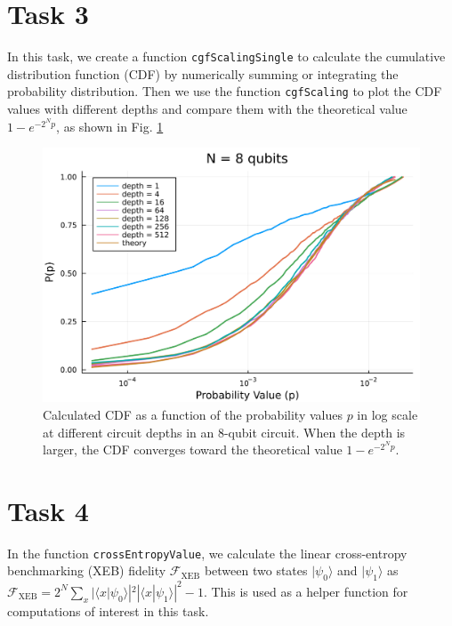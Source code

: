 \documentclass[12pt]{article}
\begin{document}
\section*{Task 3}

In this task, we create a function \texttt{cgfScalingSingle} to calculate the cumulative distribution function (CDF) by numerically summing or integrating the probability distribution. Then we use the function \texttt{cgfScaling} to plot the CDF values with different depths and compare them with the theoretical value $1-e^{-2^Np}$, as shown in Fig. \ref{fig:cdf}

\begin{figure}
	\centering
	\includegraphics [width=0.8\linewidth] {figures/Task3}
	\caption{
		Calculated CDF as a function of the probability values $p$ in log scale at different circuit depths in an 8-qubit circuit. When the depth is larger, the CDF converges toward the theoretical value $1- e^{-2^Np}$.
	}
	\label{fig:cdf}
\end{figure}

\section*{Task 4}

In the function \texttt{crossEntropyValue}, we calculate the linear cross-entropy benchmarking (XEB) fidelity $\mathcal{F}_\mathrm{XEB}$ between two states $|\psi_0\rangle$ and $|\psi_1\rangle$ as $\mathcal{F}_\mathrm{XEB} = 2^N \sum_{x} |\langle x|\psi_0\rangle|^2 |\langle x|\psi_1\rangle|^2 - 1$. This is used as a helper function for computations of interest in this task. 
\end{document}
